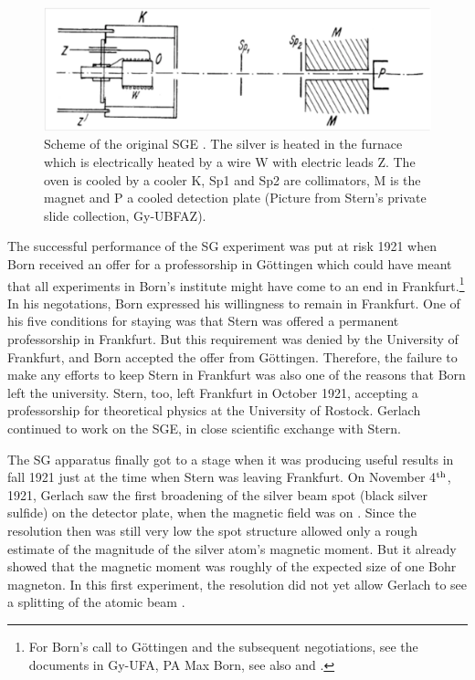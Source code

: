 \documentclass{article}
\begin{document}
\begin{figure}
\begin{center}
\includegraphics[scale=0.5]{figures/SGE_original_scheme}
\caption{Scheme of the original SGE \cite[p.~677]{GerlachWEtal1924Richtungsquantelung}. The silver is heated in the furnace which is electrically heated by a wire W with electric leads Z. The oven is cooled by a cooler K, Sp1 and Sp2 are collimators, M is the magnet and P a cooled detection plate (Picture from Stern's private slide collection, Gy-UBFAZ).}
\label{fig:SGEorigscheme}
\end{center}
\end{figure}

The successful performance of the SG experiment was put at risk 1921 when Born received an offer for a professorship in Göttingen which could have meant that all experiments in Born's institute might have come to an end in Frankfurt.\footnote{For Born's call to G\"ottingen and the subsequent negotiations, see the documents in Gy-UFA, PA Max Born, see also \cite[esp.~Docs.~75, 95]{CPAE10} and \citep{DahmsHJ2002Politics}.}
In his negotations, Born expressed his willingness to remain in Frankfurt. One of his five conditions for staying was that Stern was offered a permanent professorship in Frankfurt. But this requirement was denied by the University of Frankfurt, and Born accepted the offer from Göttingen. Therefore, the failure to make any efforts to keep Stern in Frankfurt was also one of the reasons that Born left the university. Stern, too, left Frankfurt in October 1921, accepting a professorship for theoretical physics at the University of Rostock. Gerlach continued to work on the SGE, in close scientific exchange with Stern. 

The SG apparatus finally got to a stage when it was producing useful results in fall 1921 just at the time when Stern was leaving Frankfurt. On November 4$^{\rm th}$, 1921, Gerlach saw the first broadening of the silver beam spot (black silver sulfide) on the detector plate, when the magnetic field was on \citep{GerlachWEtal1921Nachweis,GerlachW1969Stern,GerlachW1969Entdeckung}. Since the resolution then was still very low the spot structure allowed only a rough estimate of the magnitude of the silver atom's magnetic moment. But it already showed that the magnetic moment was roughly of the expected size of one Bohr magneton. In this first experiment, the resolution did not yet allow Gerlach to see a splitting of the atomic beam \citep{GerlachWEtal1921Nachweis}.    
\end{document}
